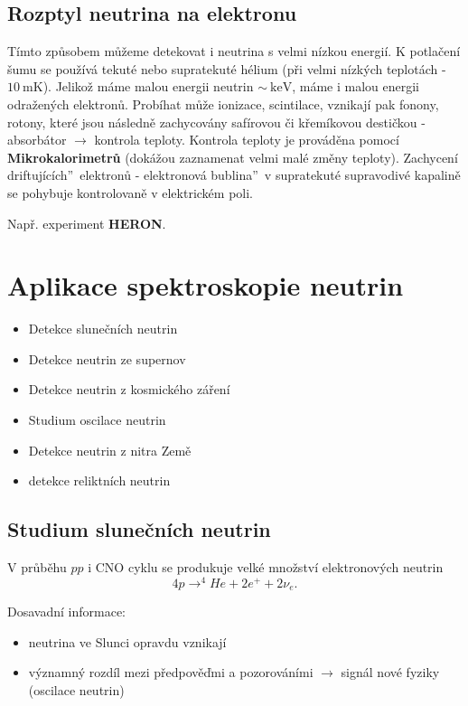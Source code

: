 \documentclass[../../main.tex]{subfiles}
\begin{document}
\subsection{Rozptyl neutrina na elektronu}

Tímto způsobem můžeme detekovat i neutrina s velmi nízkou energií. K potlačení šumu se používá tekuté nebo supratekuté hélium (při velmi nízkých teplotách - $10 ~\mathrm{mK}$). Jelikož máme malou energii neutrin $\sim ~\mathrm{keV}$, máme i malou energii odražených elektronů. Probíhat může ionizace, scintilace, vznikají pak fonony, rotony, které jsou následně zachycovány safírovou či křemíkovou destičkou - absorbátor $\rightarrow$ kontrola teploty. Kontrola teploty je prováděna pomocí \textbf{Mikrokalorimetrů} (dokážou zaznamenat velmi malé změny teploty). Zachycení \quotedblbase driftujících\textquotedblright ~elektronů - \quotedblbase elektronová bublina\textquotedblright ~v supratekuté supravodivé kapalině se pohybuje kontrolovaně v elektrickém poli.

Např. experiment \textbf{HERON}.

\section{Aplikace spektroskopie neutrin}

\begin{itemize}
	\item Detekce slunečních neutrin
	\item Detekce neutrin ze supernov
	\item Detekce neutrin z kosmického záření
	\item Studium oscilace neutrin
	\item Detekce neutrin z nitra Země
	\item detekce reliktních neutrin
\end{itemize}

\subsection{Studium slunečních neutrin}

V průběhu $pp$ i CNO cyklu se produkuje velké množství elektronových neutrin
\begin{equation}
4p \rightarrow ^{4}He + 2 e^+ + 2 \nu_e.
\end{equation}

Dosavadní informace:
\begin{itemize}
	\item neutrina ve Slunci opravdu vznikají
	\item významný rozdíl mezi předpověďmi a pozorováními $\rightarrow$ signál nové fyziky (oscilace neutrin)
\end{itemize}
\end{document}
